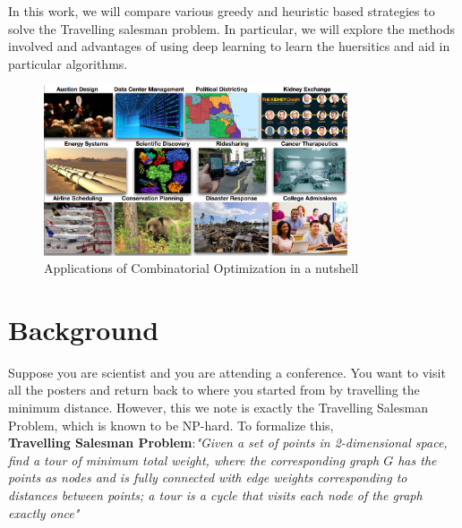 \documentclass{article}
\theoremstyle{definition}
\begin{document}
In this work, we will compare various greedy and heuristic based strategies to solve the Travelling salesman problem. In particular, we will explore the methods involved and advantages of using deep learning to learn the huersitics and aid in particular algorithms. 

\begin{figure}[H]
    \centering
    \includegraphics[width=0.8\textwidth]{images/Applications.png}
    \caption{Applications of Combinatorial Optimization in a nutshell \cite{tutorial}}
    \label{fig:my_label}
\end{figure}
\section{Background}
Suppose you are scientist and you are attending a conference. You want to visit all the posters and return back to where you started from by travelling the minimum distance. However, this we note is exactly the Travelling Salesman Problem, which is known to be NP-hard. To formalize this,\\


\textbf{Travelling Salesman Problem}:\emph{"Given a set of points in 2-dimensional space, find a tour
of minimum total weight, where the corresponding graph $G$ has the points as nodes and is fully
connected with edge weights corresponding to distances between points; a tour is a cycle that visits each node of the graph exactly once"}\\
\end{document}
